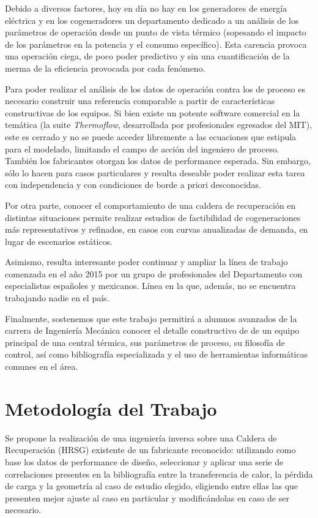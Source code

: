 \documentclass[a4paper]{article}
\begin{document}
Debido a diversos factores, hoy en día no hay en los generadores de energía eléctrica y en los cogeneradores un departamento dedicado a un análisis de los parámetros de operación desde un punto de vista térmico (sopesando el impacto de los parámetros en la potencia y el consumo específico). Esta carencia provoca una operación ciega, de poco poder predictivo y sin una cuantificación de la merma de la eficiencia provocada por cada fenómeno.

Para poder realizar el análisis de los datos de operación contra los de proceso es necesario construir una referencia comparable a partir de características constructivas de los equipos. Si bien existe un potente software comercial en la temática (la suite \textit{Thermoflow}, desarrollada por profesionales egresados del MIT), este es cerrado y no se puede acceder libremente a las ecuaciones que estipula para el modelado, limitando el campo de acción del ingeniero de proceso. También los fabricantes otorgan los datos de performance esperada. Sin embargo, sólo lo hacen para casos particulares y resulta deseable poder realizar esta tarea con independencia y con condiciones de borde a priori desconocidas.

Por otra parte, conocer el comportamiento de una caldera de recuperación en distintas situaciones permite realizar estudios de factibilidad de cogeneraciones más representativos y refinados, en casos con curvas anualizadas de demanda, en lugar de escenarios estáticos.

Asimismo, resulta interesante poder continuar y ampliar la línea de trabajo comenzada en el año 2015 por un grupo de profesionales del Departamento con especialistas españoles y mexicanos. Línea en la que, además, no se encuentra trabajando nadie en el país.

Finalmente, sostenemos que este trabajo permitirá a alumnos avanzados de la carrera de Ingeniería Mecánica conocer el detalle constructivo de de un equipo principal de una central térmica, sus parámetros de proceso, su filosofía de control, así como bibliografía especializada y el uso de herramientas informáticas comunes en el área.

\section*{Metodología del Trabajo}

Se propone la realización de una ingeniería inversa sobre una Caldera de Recuperación (HRSG) existente de un fabricante reconocido: utilizando como base los datos de performance de diseño, seleccionar y aplicar una serie de correlaciones presentes en la bibliografía entre la transferencia de calor, la pérdida de carga y la geometría al caso de estudio elegido, eligiendo entre ellas las que presenten mejor ajuste al caso en particular y modificándolas en caso de ser necesario. 
\end{document}
